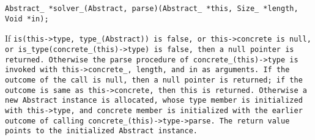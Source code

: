 
\tt{Abstract_ *solver_(Abstract, parse)(Abstract_ *this, Size_ *length, Void *in);}


\noindent If \tt{is(this->type, type_(Abstract))} is \tt{false},
or \tt{this->concrete} is null, or \tt{is_type(concrete_(this)->type)}
is \tt{false}, then a null pointer is returned.
Otherwise the \tt{parse} procedure of \tt{concrete_(this)->type} is
invoked with \tt{this->concrete_}, \tt{length}, and \tt{in} as arguments.
If the outcome of the call is null, then a null pointer is returned;
if the outcome is same as \tt{this->concrete}, then \tt{this} is returned.
Otherwise a new \tt{Abstract} instance is allocated, whose \tt{type} member
is initialized with \tt{this->type}, and \tt{concrete} member is initialized
with the earlier outcome of calling \tt{concrete_(this)->type->parse}.
The return value points to the initialized \tt{Abstract} instance.
